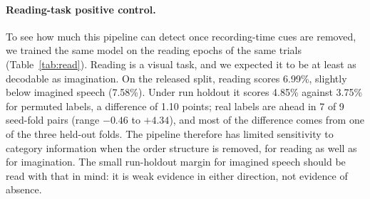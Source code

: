 \paragraph{Reading-task positive control.}
To see how much this pipeline can detect once recording-time cues are removed, we trained the same
model on the reading epochs of the same trials (Table~\ref{tab:read}). Reading is a visual task, and
we expected it to be at least as decodable as imagination. On the released split, reading scores
6.99\%, slightly below imagined speech (7.58\%). Under run holdout it scores 4.85\% against 3.75\% for
permuted labels, a difference of 1.10 points; real labels are ahead in 7 of 9 seed-fold pairs
(range $-0.46$ to $+4.34$), and most of the difference comes from one of the three held-out folds.
The pipeline therefore has limited sensitivity to category information when the order structure is
removed, for reading as well as for imagination. The small run-holdout margin for imagined speech
should be read with that in mind: it is weak evidence in either direction, not evidence of absence.

\begin{table}[t]
\centering
\small
\caption{\textbf{Reading-task control} (validation-selected accuracy, \%; 250\,Hz, 30 epochs; 6{,}387
reading epochs of 5\,s). The last column repeats the imagined-speech difference from
Table~\ref{tab:splits} for comparison. The permuted-label reading model was run only for run
holdout.}
\label{tab:read}

\end{table}
